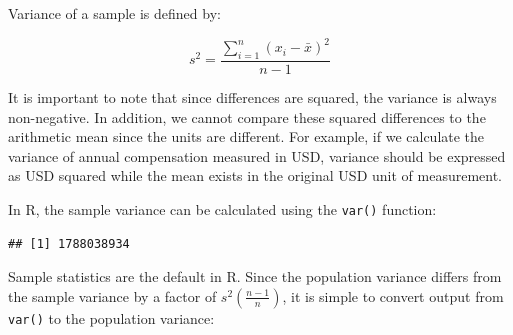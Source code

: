 \documentclass[
]{book}
\newenvironment{Shaded}{\begin{snugshade}}{\end{snugshade}}
\newcommand{\CommentTok}[1]{\textcolor[rgb]{0.56,0.35,0.01}{\textit{#1}}}
\newcommand{\DecValTok}[1]{\textcolor[rgb]{0.00,0.00,0.81}{#1}}
\newcommand{\FunctionTok}[1]{\textcolor[rgb]{0.00,0.00,0.00}{#1}}
\newcommand{\NormalTok}[1]{#1}
\newcommand{\OtherTok}[1]{\textcolor[rgb]{0.56,0.35,0.01}{#1}}
\newcommand{\SpecialCharTok}[1]{\textcolor[rgb]{0.00,0.00,0.00}{#1}}
\newcommand{\StringTok}[1]{\textcolor[rgb]{0.31,0.60,0.02}{#1}}
\begin{document}
Variance of a sample is defined by:

\[ s^{2} = \frac{\displaystyle\sum_{i=1}^{n} (x_{i}-\bar{x})^{2}}{n-1} \]

It is important to note that since differences are squared, the variance is always non-negative. In addition, we cannot compare these squared differences to the arithmetic mean since the units are different. For example, if we calculate the variance of annual compensation measured in USD, variance should be expressed as USD squared while the mean exists in the original USD unit of measurement.

In R, the sample variance can be calculated using the \texttt{var()} function:

\begin{Shaded}
\end{Shaded}

\begin{verbatim}
## [1] 1788038934
\end{verbatim}

Sample statistics are the default in R. Since the population variance differs from the sample variance by a factor of \(s^2 (\frac{n - 1}{n})\), it is simple to convert output from \texttt{var()} to the population variance:

\begin{Shaded}
\end{Shaded}
\end{document}
